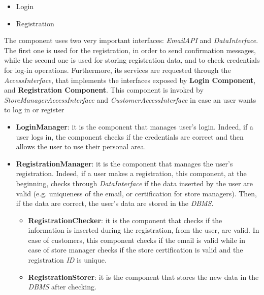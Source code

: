 \documentclass{article}
\begin{document}
					\begin{itemize}
						\item Login
						\item Registration
					\end{itemize}
				
					The component uses two very important interfaces: \emph{EmailAPI} and \emph{DataInterface}. The first one is used for the registration, in order to send confirmation messages, while the second one is used for storing registration data, and to check credentials for log-in operations. Furthermore, its services are requested through the \emph{AccessInterface}, that implements the interfaces exposed by {\bfseries Login Component}, and {\bfseries Registration Component}. This component is invoked by \emph{StoreManagerAccessInterface} and \emph{CustomerAccessInterface} in case an user wants to log in or register
					
					\begin{itemize}
						\item {\bfseries LoginManager}: it is the component that manages user’s login. Indeed, if a user logs in, the component checks if the credentials are correct and then allows the user to use their personal area.
						
						\item {\bfseries RegistrationManager}: it is the component that manages the user’s registration. Indeed, if a user makes a registration, this component, at the beginning, checks through \emph{DataInterface} if the data inserted by the user are valid (e.g. uniqueness of the email, or certification for store managers). Then, if the data are correct, the user’s data are stored in the \emph{DBMS}.
						
						\begin{itemize}
							\item {\bfseries RegistrationChecker}: it is the component that checks if the information is inserted during the registration, from the user, are valid. In case of customers, this component checks if the email is valid while in case of store manager checks if the store certification is valid and the registration \emph{ID} is unique.
							
							\item {\bfseries RegistrationStorer}: it is the component that stores the new data in the \emph{DBMS} after checking.
						\end{itemize}
					\end{itemize}
				
\end{document}
